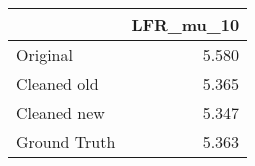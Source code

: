 \begin{tabular}{lr}
\toprule
{} & LFR_mu_10 \\
\midrule
Original     &     5.580 \\
Cleaned old  &     5.365 \\
Cleaned new  &     5.347 \\
Ground Truth &     5.363 \\
\bottomrule
\end{tabular}

